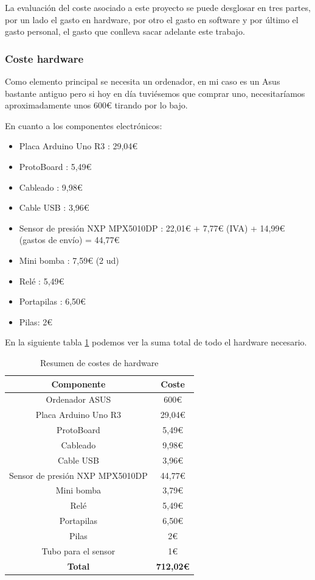 La evaluación del coste asociado a este proyecto se puede desglosar en tres partes, por un lado el gasto en hardware, por otro el gasto en software y por último el gasto personal, el gasto que conlleva sacar adelante este trabajo.

\subsubsection{Coste hardware}
Como elemento principal se necesita un ordenador, en mi caso es un Asus bastante antiguo pero si hoy en día tuviésemos que comprar uno, necesitaríamos aproximadamente unos 600€ tirando por lo bajo.

En cuanto a los componentes electrónicos:
\begin{itemize}
    \item Placa Arduino Uno R3 \cite{compraplaca}: 29,04€
    \item ProtoBoard \cite{compraproto}: 5,49€
    \item Cableado \cite{compracables}: 9,98€
    \item Cable USB \cite{comprausb}: 3,96€
    \item Sensor de presión NXP MPX5010DP \cite{comprasensor}: 22,01€ + 7,77€ (IVA) + 14,99€ (gastos de envío) = 44,77€
    \item Mini bomba \cite{comprabomba}: 7,59€ (2 ud)
    \item Relé \cite{comprarele}: 5,49€
    \item Portapilas \cite{compraporta}: 6,50€
    \item Pilas: 2€
\end{itemize}
En la siguiente tabla \ref{tab:costes} podemos ver la suma total de todo el hardware necesario.

\begin{table}[h!]
\centering
\begin{tabular}{ |c|c| }
\hline
\rowcolor[HTML]{B0E0E6} 
\textbf{Componente} & \textbf{Coste} \\
\hline
Ordenador ASUS & 600€ \\
\hline
Placa Arduino Uno R3 & 29,04€ \\
\hline
ProtoBoard & 5,49€ \\
\hline
Cableado & 9,98€ \\
\hline
Cable USB & 3,96€ \\
\hline
Sensor de presión NXP MPX5010DP & 44,77€ \\
\hline
Mini bomba & 3,79€ \\
\hline
Relé & 5,49€ \\
\hline
Portapilas & 6,50€ \\
\hline
Pilas & 2€ \\
\hline
Tubo para el sensor & 1€ \\
\hline
\rowcolor[HTML]{4682B4} 
\textbf{Total} & \textbf{712,02€} \\
\hline
\end{tabular}
\caption{Resumen de costes de hardware}
\label{tab:costes}
\end{table}

